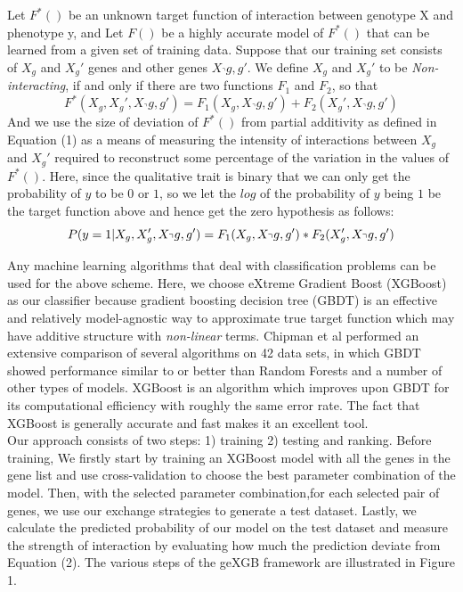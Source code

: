 \documentclass[11pt]{article}
\theoremstyle{plain}
\theoremstyle{definition}
\theoremstyle{remark}
\begin{document}
\noindent Let $F^*()$ be an unknown target function of interaction between genotype X and phenotype y, and Let $F()$ be a highly accurate model of $F^*()$ that can be learned from a given set of training data.
Suppose that our training set consists of $X_g$ and $X_g'$ genes and other genes $X_\urcorner g,g'$. We define $X_g$ and $X_g'$ to be {\em Non-interacting}, if and only if there are two functions $F_1$ and $F_2$, so that
\begin{equation}
F^*(X_g,X_g',X_\urcorner g,g') = F_1(X_g,X_\urcorner g,g')+F_2(X_g',X_\urcorner g,g')
\end{equation}
\noindent And we use the size of deviation of $F^*()$ from partial additivity as defined in Equation (1) as a means of measuring the intensity of interactions between $X_g$ and $X_g'$ required to reconstruct some percentage of the variation in the values of $F^*()$. Here, since the qualitative trait is binary that we can only get the probability of $y$ to be $0$ or $1$, so we let the $log$ of the probability of $y$ being $1$ be the target function above and hence get the zero hypothesis as follows:
\begin{equation}
P(y=1|X_g,X_g',X_\urcorner g,g')=F_1(X_g,X_\urcorner g,g')*F_2(X_g',X_\urcorner g,g')\\
\end{equation}

\noindent Any machine learning algorithms that deal with classification problems can be used for the above scheme. Here, we choose eXtreme Gradient Boost (XGBoost) as our classifier because gradient boosting decision tree (GBDT) is an effective and relatively model-agnostic way to approximate true target function which may have additive structure with {\em non-linear} terms. Chipman et al performed an extensive comparison of several algorithms on 42 data sets, in which GBDT showed performance similar to or better than Random Forests and a number of other types of models. XGBoost is an algorithm which improves upon GBDT for its computational efficiency with roughly the same error rate. The fact that XGBoost is generally accurate and fast makes it an excellent tool.\\

\noindent Our approach consists of two steps: 1) training 2) testing and ranking. Before training, We firstly start by training an XGBoost model with all the genes in the gene list and use cross-validation to choose the best parameter combination of the model. Then, with the selected parameter combination,for each selected pair of genes, we use our exchange strategies to generate a test dataset. Lastly, we calculate the predicted probability of our model on the test dataset and measure the strength of interaction by evaluating how much the prediction deviate from Equation (2). The various steps of the geXGB framework are illustrated in Figure 1.
\end{document}
